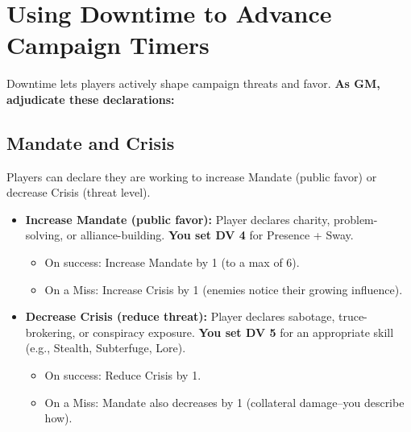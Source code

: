 \section{Using Downtime to Advance Campaign Timers}
\label{sec:downtime-timers}
Downtime lets players actively shape campaign threats and favor. \textbf{As GM, adjudicate these declarations:}  

\subsection{Mandate and Crisis}
\label{subsec:mandate-crisis}
Players can declare they are working to increase Mandate (public favor) or decrease Crisis (threat level). 
\begin{itemize}
  \item \textbf{Increase Mandate (public favor):} 
        Player declares charity, problem-solving, or alliance-building. 
        \textbf{You set DV 4} for Presence + Sway. 
        \begin{itemize}
          \item On success: Increase Mandate by 1 (to a max of 6). 
          \item On a Miss: Increase Crisis by 1 (enemies notice their growing influence). 
        \end{itemize}
  \item \textbf{Decrease Crisis (reduce threat):} 
        Player declares sabotage, truce-brokering, or conspiracy exposure. 
        \textbf{You set DV 5} for an appropriate skill (e.g., Stealth, Subterfuge, Lore). 
        \begin{itemize}
          \item On success: Reduce Crisis by 1. 
          \item On a Miss: Mandate also decreases by 1 (collateral damage--you describe how). 
        \end{itemize}
\end{itemize}

